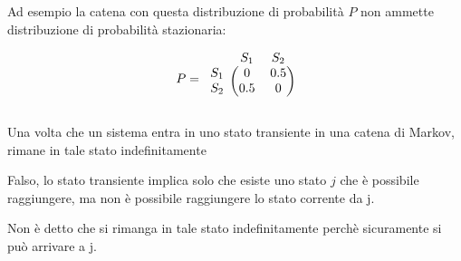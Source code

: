 \documentclass{article}
\begin{document}
Ad esempio la catena con questa distribuzione di probabilità $P$ non ammette distribuzione di probabilità stazionaria:

\[
P = 
\begin{blockarray}{ccc}
	& S_1 & S_2 \\
	\begin{block}{c(cc)}
		S_1  &  0     & 0.5 \\
		S_2  &  0.5   & 0 \\
	\end{block}
\end{blockarray}
\]


%

\begin{flushleft}
	Una volta che un sistema entra in uno stato transiente in una catena di Markov, rimane in tale stato indefinitamente 
\end{flushleft}

Falso, lo stato transiente implica solo che esiste uno stato $j$ che è possibile raggiungere, ma non è possibile raggiungere lo stato corrente da j.

Non è detto che si rimanga in tale stato indefinitamente perchè sicuramente si può arrivare a j.
\end{document}
